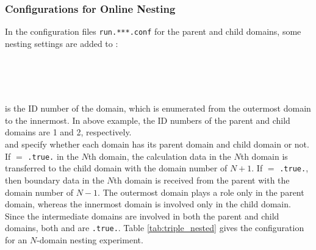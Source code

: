 \subsubsection{Configurations for Online Nesting}
In the configuration files \verb|run.***.conf| for the parent and child domains, some nesting settings are added to :

\\
~\\
\\

 is the ID number of the domain, which is enumerated from the outermost domain to the innermost.
In above example, the ID numbers of the parent and child domains are 1 and 2, respectively.\\
 and  specify whether each domain has its parent domain and child domain or not.
If  $=$ \verb|.true.| in the $N$th domain, the calculation data in the $N$th domain is transferred to the child domain with the domain number of $N+1$.
If  $=$ \verb|.true.|, then boundary data in the $N$th domain is received from the parent with the domain number of $N-1$.
The outermost domain plays a role only in the parent domain, whereas the innermost domain is involved only in the child domain.
Since the intermediate domains are involved in both the parent and child domains, both  and  are \verb|.true.|.
Table \ref{tab:triple_nested} gives the configuration for an $N$-domain nesting experiment.

